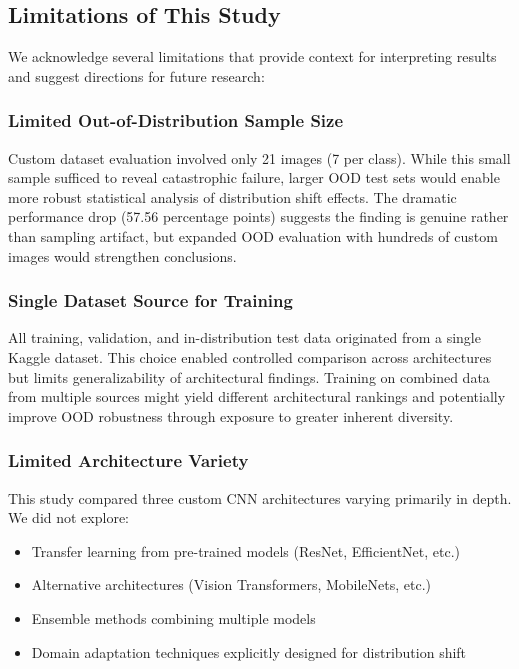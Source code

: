 \documentclass[12pt,a4paper]{article}
\begin{document}
\subsection{Limitations of This Study}

We acknowledge several limitations that provide context for interpreting results and suggest directions for future research:

\subsubsection{Limited Out-of-Distribution Sample Size}

Custom dataset evaluation involved only 21 images (7 per class). While this small sample sufficed to reveal catastrophic failure, larger OOD test sets would enable more robust statistical analysis of distribution shift effects. The dramatic performance drop (57.56 percentage points) suggests the finding is genuine rather than sampling artifact, but expanded OOD evaluation with hundreds of custom images would strengthen conclusions.

\subsubsection{Single Dataset Source for Training}

All training, validation, and in-distribution test data originated from a single Kaggle dataset. This choice enabled controlled comparison across architectures but limits generalizability of architectural findings. Training on combined data from multiple sources might yield different architectural rankings and potentially improve OOD robustness through exposure to greater inherent diversity.

\subsubsection{Limited Architecture Variety}

This study compared three custom CNN architectures varying primarily in depth. We did not explore:

\begin{itemize}
    \item Transfer learning from pre-trained models (ResNet, EfficientNet, etc.)
    \item Alternative architectures (Vision Transformers, MobileNets, etc.)
    \item Ensemble methods combining multiple models
    \item Domain adaptation techniques explicitly designed for distribution shift
\end{itemize}
\end{document}
